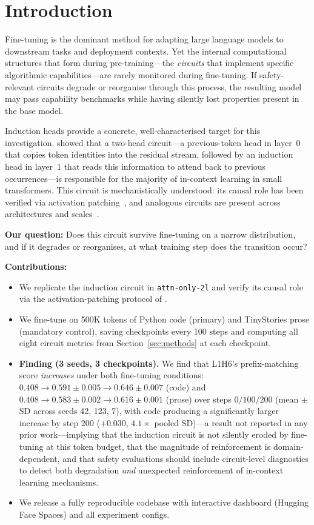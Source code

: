 \section{Introduction}

Fine-tuning is the dominant method for adapting large language models to
downstream tasks and deployment contexts.
Yet the internal computational structures that form during pre-training---the
\emph{circuits} that implement specific algorithmic capabilities---are rarely
monitored during fine-tuning.
If safety-relevant circuits degrade or reorganise through this process, the
resulting model may pass capability benchmarks while having silently lost
properties present in the base model.

Induction heads provide a concrete, well-characterised target for this
investigation.
\citet{olsson2022context} showed that a two-head circuit---a previous-token
head in layer~0 that copies token identities into the residual stream, followed
by an induction head in layer~1 that reads this information to attend back to
previous occurrences---is responsible for the majority of in-context learning
in small transformers.
This circuit is mechanistically understood: its causal role has been verified
via activation patching~\citep{conmy2023automated}, and analogous circuits are
present across architectures and scales~\citep{elhage2021mathematical}.

\textbf{Our question:}
Does this circuit survive fine-tuning on a narrow distribution, and if it
degrades or reorganises, at what training step does the transition occur?

\textbf{Contributions:}
\begin{itemize}[leftmargin=*]
  \item We replicate the induction circuit in \texttt{attn-only-2l} and verify
    its causal role via the activation-patching protocol of
    \citet{conmy2023automated}.
  \item We fine-tune on 500K tokens of Python code (primary) and TinyStories
    prose (mandatory control), saving checkpoints every 100 steps and computing
    all eight circuit metrics from Section~\ref{sec:methods} at each checkpoint.
  \item \textbf{Finding (3 seeds, 3 checkpoints).}
    We find that L1H6's prefix-matching score \emph{increases} under both
    fine-tuning conditions: $0.408 \to 0.591 \pm 0.005 \to 0.646 \pm 0.007$
    (code) and $0.408 \to 0.583 \pm 0.002 \to 0.616 \pm 0.001$ (prose)
    over steps $0/100/200$ (mean $\pm$ SD across seeds 42, 123, 7), with code
    producing a significantly larger increase by step 200
    ($+0.030$, $4.1\times$ pooled SD)---a result not reported in any
    prior work---implying that the induction circuit is not silently eroded
    by fine-tuning at this token budget, that the magnitude of reinforcement
    is domain-dependent, and that safety evaluations should include
    circuit-level diagnostics to detect both degradation \emph{and}
    unexpected reinforcement of in-context learning mechanisms.
  \item We release a fully reproducible codebase with interactive dashboard
    (Hugging Face Spaces) and all experiment configs.
\end{itemize}

